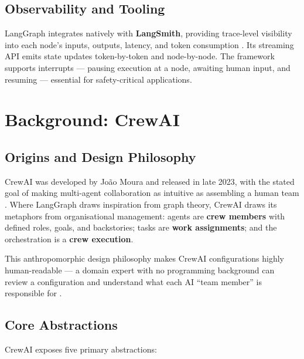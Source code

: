 \documentclass[12pt,a4paper]{article}
\begin{document}
\subsection{Observability and Tooling}

LangGraph integrates natively with \textbf{LangSmith}, providing trace-level
visibility into each node's inputs, outputs, latency, and token consumption
\cite{LangGraph2023Docs}. Its streaming API emits state updates token-by-token
and node-by-node. The framework supports interrupts --- pausing execution at a
node, awaiting human input, and resuming --- essential for safety-critical
applications.

\section{Background: CrewAI}

\subsection{Origins and Design Philosophy}

CrewAI was developed by Jo\~ao Moura and released in late 2023, with the
stated goal of making multi-agent collaboration as intuitive as assembling a
human team \cite{Doe2022CrewAI}. Where LangGraph draws inspiration from graph
theory, CrewAI draws its metaphors from organisational management: agents are
\textbf{crew members} with defined roles, goals, and backstories; tasks are
\textbf{work assignments}; and the orchestration is a \textbf{crew execution}.

This anthropomorphic design philosophy makes CrewAI configurations highly
human-readable --- a domain expert with no programming background can review
a configuration and understand what each AI ``team member'' is responsible for
\cite{CrewAI2023Docs}.

\subsection{Core Abstractions}

CrewAI exposes five primary abstractions:
\end{document}
